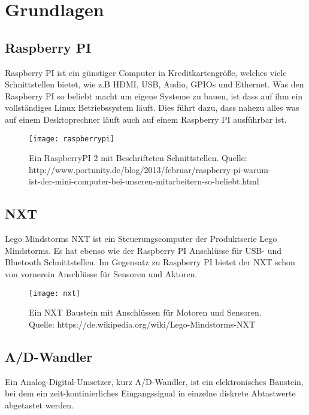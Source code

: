 \chapter{Grundlagen}
\section{Raspberry PI}
\label{Grundlagen:RaspberryPI}

Raspberry PI ist ein günstiger Computer in Kreditkartengröße, welches viele Schnittstellen bietet, wie z.B HDMI, USB, Audio, GPIOs und Ethernet.
Was den Raspberry PI so beliebt macht um eigene Systeme zu bauen, ist dass auf ihm ein vollständiges Linux Betriebssystem läuft. Dies führt dazu, dass nahezu alles was auf einem Desktoprechner läuft auch auf einem Raspberry PI ausführbar ist.

\begin{figure}[h]
  \centering
  \texttt{[image: raspberrypi]}
  \caption{Ein RaspberryPI 2 mit Beschrifteten Schnittstellen. Quelle: http://www.portunity.de/blog/2013/februar/raspberry-pi-warum-ist-der-mini-computer-bei-unseren-mitarbeitern-so-beliebt.html}
  \label{Kap1:RaspberryPI}
\end{figure}

\section{NXT}
\label{Grundlagen:NXT}

Lego Mindstorms NXT ist ein Steuerungscomputer der Produktserie Lego Mindstorms. Es hat ebenso wie der Raspberry PI Anschlüsse für USB- und Bluetooth Schnittstellen. Im Gegensatz zu Raspberry PI bietet der NXT schon von vornerein Anschlüsse für Sensoren und Aktoren. 

\begin{figure}[h]
  \centering
  \texttt{[image: nxt]}
  \caption{Ein NXT Baustein mit Anschlüssen für Motoren und Sensoren. Quelle: https://de.wikipedia.org/wiki/Lego-Mindstorms-NXT}
  \label{Kap1:NXT}
\end{figure}

\section{A/D-Wandler}

Ein Analog-Digital-Umsetzer, kurz A/D-Wandler, ist ein elektronisches Baustein, bei dem ein zeit-kontinierliches Eingangssignal in einzelne diskrete Abtastwerte abgetastet werden.

